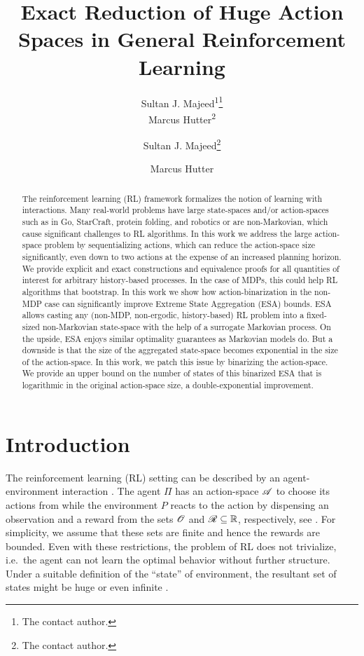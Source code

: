 \documentclass{article} %
\author{
Sultan J. Majeed\textsuperscript{\rm 1}\thanks{The contact author.}\\
Marcus Hutter\textsuperscript{\rm 2}\\
}
\author{
Sultan J. Majeed\thanks{The contact author.}
\contact{sultan.pk} \affiliation{Research School of Computer Science, ANU}
\and
Marcus Hutter%
\contact{hutter1.net} \affiliation{Google DeepMind \& Research School of Computer Science, ANU}
}
\title{
Exact Reduction of Huge Action Spaces in General Reinforcement Learning%
}
\begin{document}


\maketitle


\begin{abstract}
The reinforcement learning (RL) framework formalizes the notion of learning with interactions.
Many real-world problems have large state-spaces and/or action-spaces such as in Go, StarCraft, protein folding, and robotics or are non-Markovian, which cause significant challenges to RL algorithms.
In this work we address the large action-space problem by sequentializing actions, which can reduce the action-space size significantly, even down to two actions at the expense of an increased planning horizon. We provide explicit and exact constructions and equivalence proofs for all quantities of interest for arbitrary history-based processes. In the case of MDPs, this could help RL algorithms that bootstrap.
In this work we show how action-binarization in the non-MDP case can significantly improve Extreme State Aggregation (ESA) bounds. ESA allows casting any (non-MDP, non-ergodic, history-based) RL problem into a fixed-sized non-Markovian state-space with the help of a surrogate Markovian process. On the upside, ESA enjoys similar optimality guarantees as Markovian models do. But a downside is that the size of the aggregated state-space becomes exponential in the size of the action-space. In this work, we patch this issue by binarizing the action-space. We provide an upper bound on the number of states of this binarized ESA that is logarithmic in the original action-space size, a double-exponential improvement.
\end{abstract}



\section{Introduction}

The reinforcement learning (RL) setting can be described by an agent-environment interaction \cite{Sutton2018}. The agent $\Pi$ has an action-space $\mathscr{A}$ to choose its actions from while the environment $P$ reacts to the action by dispensing an observation and a reward from the sets $\mathscr{O}$ and $\mathscr{R} \subseteq \mathbb{R}$, respectively, see . For simplicity, we assume that these sets are finite and hence the rewards are bounded. Even with these restrictions, the problem of RL does not trivialize, i.e.\ the agent can not learn the optimal behavior without further structure. Under a suitable definition of the ``state'' of environment, the resultant set of states might be huge or even infinite \cite{Powell2011}.
\end{document}

